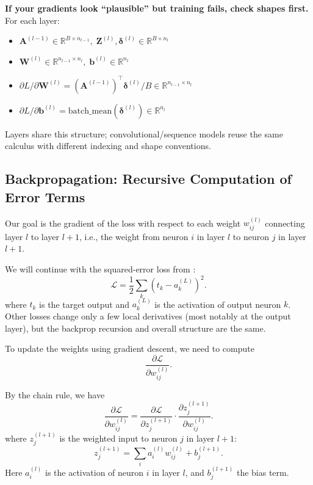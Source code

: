 \begin{tcolorbox}[summarybox, title={Shape ledger for an $L$-layer MLP (batch size $B$)}]
\noindent\textbf{If your gradients look ``plausible'' but training fails, check shapes first.} For each layer:
\begin{itemize}
    \item \(\mathbf{A}^{(l-1)}\in\mathbb{R}^{B\times n_{l-1}},\; \mathbf{Z}^{(l)},\boldsymbol{\delta}^{(l)}\in\mathbb{R}^{B\times n_l}\)
    \item \(\mathbf{W}^{(l)}\in\mathbb{R}^{n_{l-1}\times n_l},\; \mathbf{b}^{(l)}\in\mathbb{R}^{n_l}\)
    \item \(\partial L/\partial \mathbf{W}^{(l)} = (\mathbf{A}^{(l-1)})^\top \boldsymbol{\delta}^{(l)} / B \in \mathbb{R}^{n_{l-1}\times n_l}\)
    \item \(\partial L/\partial \mathbf{b}^{(l)} = \mathrm{batch\_mean}(\boldsymbol{\delta}^{(l)}) \in \mathbb{R}^{n_l}\)
\end{itemize}
Layers share this structure; convolutional/sequence models reuse the same calculus with different indexing and shape conventions.
\end{tcolorbox}

\subsection{Backpropagation: Recursive Computation of Error Terms}
\label{sec:backprop_backpropagation_recursive_computation_of_error_terms}

Our goal is the gradient of the loss with respect to each weight \(w_{ij}^{(l)}\) connecting layer \(l\) to layer \(l+1\), i.e., the weight from neuron \(i\) in layer \(l\) to neuron \(j\) in layer \(l+1\).

We will continue with the squared\hyp{}error loss from :
\begin{equation}
\mathcal{L} = \frac{1}{2} \sum_{k} (t_k - a_k^{(L)})^2.
\label{eq:backprop_mse_loss}
\end{equation}
where \( t_k \) is the target output and \( a_k^{(L)} \) is the activation of output neuron \( k \). Other losses change only a few local derivatives (most notably at the output layer), but the backprop recursion and overall structure are the same.

To update the weights using gradient descent, we need to compute
\[
\frac{\partial \mathcal{L}}{\partial w_{ij}^{(l)}}.
\]

By the chain rule, we have
\begin{equation}
\frac{\partial \mathcal{L}}{\partial w_{ij}^{(l)}} = \frac{\partial \mathcal{L}}{\partial z_j^{(l+1)}} \cdot \frac{\partial z_j^{(l+1)}}{\partial w_{ij}^{(l)}}.
\label{eq:chain_rule_weight}
\end{equation}
where \( z_j^{(l+1)} \) is the weighted input to neuron \( j \) in layer \( l+1 \):
\[
z_j^{(l+1)} = \sum_i a_i^{(l)} w_{ij}^{(l)} + b_j^{(l+1)}.
\]
Here \( a_i^{(l)} \) is the activation of neuron \( i \) in layer \( l \), and \( b_j^{(l+1)} \) the bias term.

